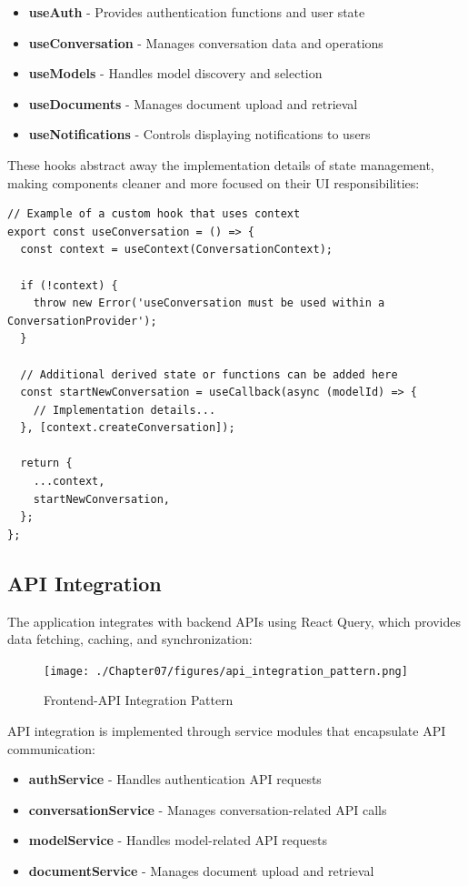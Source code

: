 \begin{itemize}
  \item \textbf{useAuth} - Provides authentication functions and user state
  \item \textbf{useConversation} - Manages conversation data and operations
  \item \textbf{useModels} - Handles model discovery and selection
  \item \textbf{useDocuments} - Manages document upload and retrieval
  \item \textbf{useNotifications} - Controls displaying notifications to users
\end{itemize}

These hooks abstract away the implementation details of state management, making components cleaner and more focused on their UI responsibilities:

\begin{verbatim}
// Example of a custom hook that uses context
export const useConversation = () => {
  const context = useContext(ConversationContext);
  
  if (!context) {
    throw new Error('useConversation must be used within a ConversationProvider');
  }
  
  // Additional derived state or functions can be added here
  const startNewConversation = useCallback(async (modelId) => {
    // Implementation details...
  }, [context.createConversation]);
  
  return {
    ...context,
    startNewConversation,
  };
};
\end{verbatim}

\subsection{API Integration}

The application integrates with backend APIs using React Query, which provides data fetching, caching, and synchronization:

\begin{figure}[h]
    \centering
    \texttt{[image: ./Chapter07/figures/api\_integration\_pattern.png]}
    \caption{Frontend-API Integration Pattern}
    \label{fig:api-integration-pattern}
\end{figure}

API integration is implemented through service modules that encapsulate API communication:

\begin{itemize}
  \item \textbf{authService} - Handles authentication API requests
  \item \textbf{conversationService} - Manages conversation-related API calls
  \item \textbf{modelService} - Handles model-related API requests
  \item \textbf{documentService} - Manages document upload and retrieval
\end{itemize}


